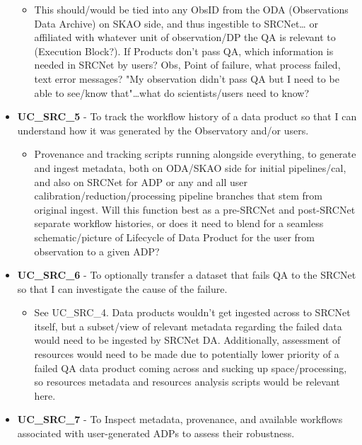 \begin{itemize}[label={}]
    \begin{itemize}[label={}]
        \item This should/would be tied into any ObsID from the ODA (Observations Data Archive) on SKAO side, and thus ingestible to SRCNet… or affiliated with whatever unit of observation/DP the QA is relevant to (Execution Block?).  If Products don’t pass QA, which information is needed in SRCNet by users?  Obs, Point of failure, what process failed, text error messages?   "My observation didn’t pass QA but I need to be able to see/know that"…what do scientists/users need to know? 
    \end{itemize}
    \item {\bf UC\_SRC\_5} - To track the workflow history of a data product so that I can understand how it was generated by the Observatory and/or users.
    \begin{itemize}[label={}]
        \item Provenance and tracking scripts running alongside everything, to generate and ingest metadata, both on ODA/SKAO side for initial pipelines/cal, and also on SRCNet for ADP or any and all user calibration/reduction/processing pipeline branches that stem from original ingest.   Will this function best as a pre-SRCNet and post-SRCNet separate workflow histories, or does it need to blend for a seamless schematic/picture of Lifecycle of Data Product for the user from observation to a given ADP? 
    \end{itemize}
    \item {\bf UC\_SRC\_6} - To optionally transfer a dataset that fails QA to the SRCNet so that I can investigate the cause of the failure.
    \begin{itemize}[label={}]
        \item See UC\_SRC\_4.  Data products wouldn’t get ingested across to SRCNet itself, but a subset/view of relevant metadata regarding the failed data would need to be ingested by SRCNet DA.  Additionally, assessment of resources would need to be made due to potentially lower priority of a failed QA data product coming across and sucking up space/processing, so resources metadata and resources analysis scripts would be relevant here.
    \end{itemize}
    \item {\bf UC\_SRC\_7} - To Inspect metadata, provenance, and available workflows associated with user-generated ADPs to assess their robustness.
    \begin{itemize}[label={}]

\end{itemize}
\end{itemize}
